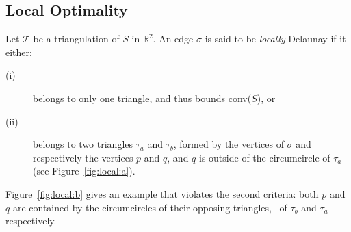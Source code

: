 \subsection{Local Optimality}
Let $\mathcal{T}$ be a triangulation of $S$ in $\mathbb{R}^2$. 
An edge $\sigma$ is said to be \emph{locally} Delaunay if it either:
\begin{description}
  \item[(i)] belongs to only one triangle, and thus bounds conv($S$), or
  \item[(ii)] belongs to two triangles $\tau_a$ and $\tau_b$, formed by the vertices of $\sigma$ and respectively the vertices $p$ and $q$, and $q$ is outside of the circumcircle of $\tau_a$ (see Figure~\ref{fig:local:a}). 
\end{description}
Figure~\ref{fig:local:b} gives an example that violates the second criteria: both $p$ and $q$ are contained by the circumcircles of their opposing triangles, \ie\ of $\tau_b$ and $\tau_a$ respectively.
